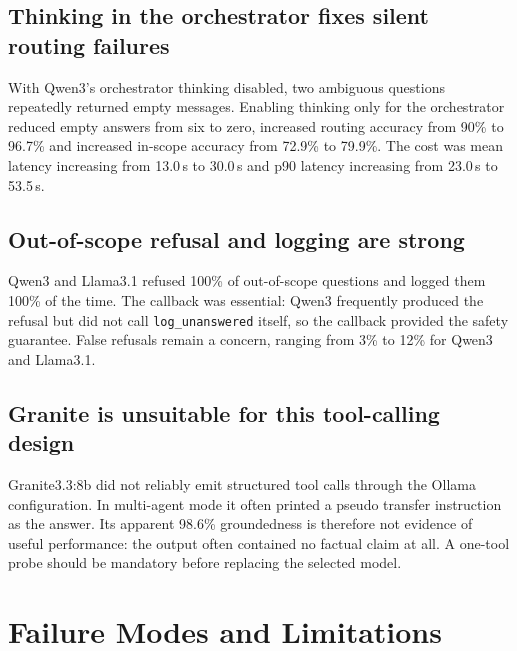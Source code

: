 \documentclass[11pt,a4paper]{article}
\newcommand{\tool}[1]{\texttt{#1}}
\begin{document}
\subsection{Thinking in the orchestrator fixes silent routing failures}
With Qwen3's orchestrator thinking disabled, two ambiguous questions repeatedly returned empty messages. Enabling thinking only for the orchestrator reduced empty answers from six to zero, increased routing accuracy from 90\% to 96.7\% and increased in-scope accuracy from 72.9\% to 79.9\%. The cost was mean latency increasing from 13.0\,s to 30.0\,s and p90 latency increasing from 23.0\,s to 53.5\,s.

\subsection{Out-of-scope refusal and logging are strong}
Qwen3 and Llama3.1 refused 100\% of out-of-scope questions and logged them 100\% of the time. The callback was essential: Qwen3 frequently produced the refusal but did not call \tool{log\_unanswered} itself, so the callback provided the safety guarantee. False refusals remain a concern, ranging from 3\% to 12\% for Qwen3 and Llama3.1.

\subsection{Granite is unsuitable for this tool-calling design}
Granite3.3:8b did not reliably emit structured tool calls through the Ollama configuration. In multi-agent mode it often printed a pseudo transfer instruction as the answer. Its apparent 98.6\% groundedness is therefore not evidence of useful performance: the output often contained no factual claim at all. A one-tool probe should be mandatory before replacing the selected model.

\section{Failure Modes and Limitations}
\label{sec:limitations}
\end{document}
